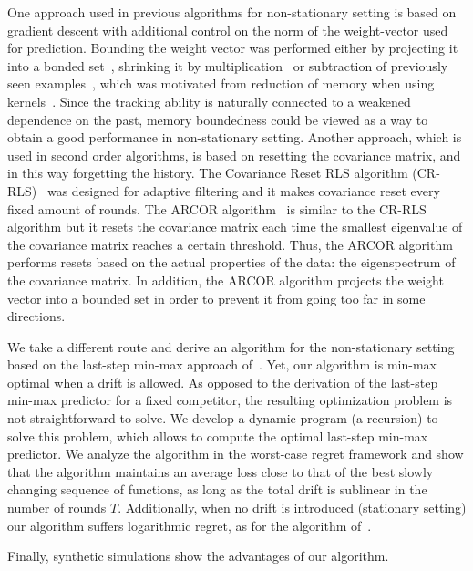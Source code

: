 One approach used in previous algorithms for non-stationary
setting is based on gradient descent with additional control on the norm of the weight-vector used for prediction.
Bounding the weight vector was performed either by projecting it into a bonded
set~\citep{HerbsterW01}, shrinking it by
multiplication~\citep{KivinenSW01,CavallantiCG07} or subtraction of previously seen
examples~\citep{CavallantiCG07}, which was motivated from reduction of memory when using kernels~\citep{CrammerKS03}. Since the tracking ability is naturally connected to a weakened dependence on the past, memory boundedness could be viewed as a way to obtain a good performance in non-stationary setting. Another approach, which is used in second order algorithms, is based on resetting the covariance matrix, and in this way forgetting the history. The Covariance Reset RLS algorithm
(CR-RLS)~\citep{Salgado,Goodwin,Chen} was designed for adaptive
filtering and it makes covariance reset every fixed amount of rounds. The ARCOR algorithm~\citep{VaitsCr11} is similar to the CR-RLS algorithm but it resets the covariance matrix each time the smallest eigenvalue of the covariance matrix reaches a certain threshold. Thus, the ARCOR algorithm performs resets based on the actual properties of the data: the eigenspectrum of the covariance matrix. In addition, the ARCOR algorithm projects the weight vector into a bounded set in order to prevent it from going too far in some directions.

We take a different route and derive an algorithm for the non-stationary setting based on the
last-step min-max approach of~\cite{Forster}. Yet, our algorithm is min-max optimal when a drift is
allowed. As opposed to the derivation of the last-step min-max
predictor for a fixed competitor, the resulting optimization
problem is not straightforward to solve. We develop a dynamic program (a
recursion) to solve this problem, which allows to compute the optimal
last-step min-max predictor. We analyze the algorithm in the
worst-case regret framework and show that the algorithm maintains an
average loss close to that of the best slowly changing sequence of
functions, as long as the total drift is sublinear in the number of
rounds $T$. Additionally, when no drift is
introduced (stationary setting) our algorithm suffers logarithmic
regret, as for the algorithm of~\cite{Forster}.


Finally, synthetic simulations show the
advantages of our algorithm. %
